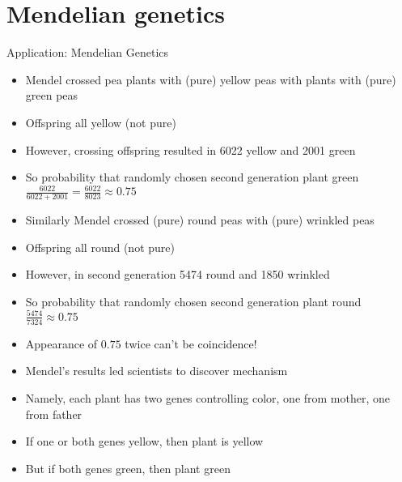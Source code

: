 \documentclass[handout]{beamer}
\theoremstyle{definition}
\begin{document}
\section{Mendelian genetics}
\begin{frame}{Application: Mendelian Genetics}
\begin{itemize}
\item Mendel crossed pea plants with (pure) yellow peas
with plants with (pure) green peas
\item Offspring all yellow (not pure)
\item However, crossing offspring resulted in 
6022 yellow and 2001 green
\item So probability that randomly chosen second generation plant green
$\frac{6022}{6022+2001}=\frac{6022}{8023}\approx 0.75$
\end{itemize}
\end{frame}
\begin{frame}
\begin{itemize}
\item Similarly Mendel crossed (pure) round peas with (pure) wrinkled peas
\item Offspring all round (not pure)
\item However, in second generation 5474 round and 1850 wrinkled
\item So probability that randomly chosen second generation plant round
$\frac{5474}{7324}\approx 0.75$
\end{itemize}
\end{frame}
\begin{frame}
\begin{itemize}
\item Appearance of $0.75$ twice can't be coincidence!
\item Mendel's results led scientists to discover mechanism
\item Namely, each plant has two genes controlling color, one
from mother, one from father
\item If one or both genes yellow, then plant is yellow
\item But if both genes green, then plant green
\end{itemize}
\end{frame}
\end{document}
